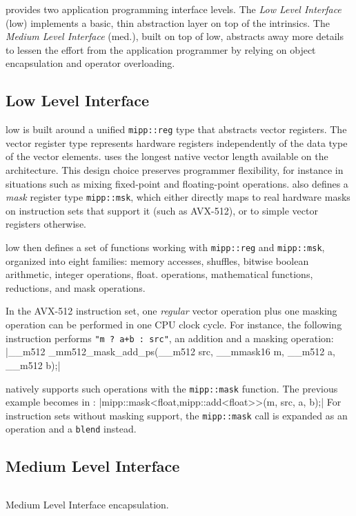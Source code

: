 \MIPP provides two application programming interface levels. The
\emph{Low Level Interface} (low) implements a basic, thin abstraction layer on
top of the intrinsics. The \emph{Medium Level Interface} (med.), built on top of
\MIPP low, abstracts away more details to lessen the effort from the application
programmer by relying on object encapsulation and operator overloading.

\subsection{Low Level Interface}

\MIPP low is built around a unified \verb|mipp::reg| type that abstracts vector
registers. The vector register type represents hardware registers independently
of the data type of the vector elements. \MIPP uses the longest native vector
length available on the architecture. This design choice preserves programmer
flexibility, for instance in situations such as mixing fixed-point and
floating-point operations. \MIPP also defines a \emph{mask} register type
\verb|mipp::msk|, which either directly maps to real hardware masks on
instruction sets that support it (such as AVX-512), or to simple vector
registers otherwise.

\MIPP low then defines a set of functions working with \verb|mipp::reg| and
\verb|mipp::msk|, organized into eight families: memory accesses, shuffles,
bitwise boolean arithmetic, integer operations, float. operations, mathematical
functions, reductions, and mask operations.

In the AVX-512 instruction set, one \textit{regular} vector operation plus one
masking operation can be performed in one CPU clock cycle. For instance, the
following instruction performs \verb|"m ? a+b : src"|, an addition and a masking
operation:
|__m512 _mm512_mask_add_ps(__m512 src, __mmask16 m, __m512 a, __m512 b);|

\MIPP natively supports such operations with the \verb|mipp::mask| function. The
previous example becomes in \MIPP:
|mipp::mask<float,mipp::add<float>>(m, src, a, b);|
For instruction sets without masking support, the \verb|mipp::mask| call is
expanded as an operation and a \verb|blend| instead.

\subsection{Medium Level Interface}

\begin{listing}
  \inputminted[frame=lines,linenos]{C++}{main/chapter3/src/mipp/mli.cpp}
  \caption{Medium Level Interface encapsulation.}
  \label{lst:vec_mipp_mli}
\end{listing}


